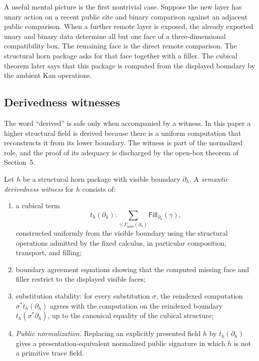 A useful mental picture is the first nontrivial case.  Suppose the new layer has unary action
on a recent public site and binary comparison against an adjacent public comparison.  When a
further remote layer is exposed, the already exported unary and binary data determine all
but one face of a three-dimensional compatibility box.  The remaining face is the direct
remote comparison.  The structural horn package asks for that face together with a filler.
The cubical theorem later says that this package is computed from the displayed boundary by
the ambient Kan operations.

\subsection{Derivedness witnesses}

The word ``derived'' is safe only when accompanied by a witness.  In this paper a higher
structural field is derived because there is a uniform computation that reconstructs it from
its lower boundary.  The witness is part of the normalized role, and the proof of its adequacy
is discharged by the open-box theorem of Section~5.

\begin{definition}
Let \(h\) be a structural horn package with visible boundary \(\partial_h\).  A
\emph{semantic derivedness witness} for \(h\) consists of:
\begin{enumerate}
\item a cubical term
\[
  t_h(\partial_h)
    : \sum_{\gamma:\Gamma_{\mathrm{miss}}(\partial_h)}
        \mathsf{Fill}_{\partial_h}(\gamma),
\]
constructed uniformly from the visible boundary using the structural operations admitted by
the fixed calculus, in particular composition, transport, and filling;
\item boundary agreement equations showing that the computed missing face and filler restrict
to the displayed visible faces;
\item substitution stability: for every substitution \(\sigma\), the reindexed computation
\(\sigma^*t_h(\partial_h)\) agrees with the computation on the reindexed boundary
\(t_h(\sigma^*\partial_h)\), up to the canonical equality of the cubical structure;

\item \emph{Public normalization.}  Replacing an explicitly presented field \(h\) by
\(t_h(\partial_h)\) gives a presentation-equivalent normalized public signature in which
\(h\) is not a primitive trace field.
\end{enumerate}
\end{definition}

